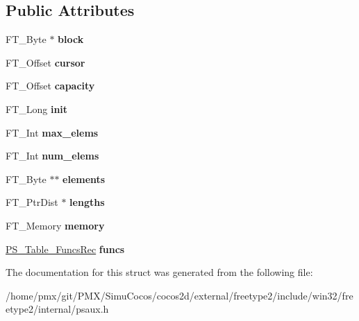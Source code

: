 \subsection*{Public Attributes}
\begin{DoxyCompactItemize}
\item 
\mbox{\label{structPS__TableRec___ae9a6fe75134258928e8cb8db52f8e4bc}} 
F\+T\+\_\+\+Byte $\ast$ {\bfseries block}
\item 
\mbox{\label{structPS__TableRec___a8725d30f75b6dc785b988ed689ac7e58}} 
F\+T\+\_\+\+Offset {\bfseries cursor}
\item 
\mbox{\label{structPS__TableRec___acf6d4f15ca247960cc7823b73d3c66bf}} 
F\+T\+\_\+\+Offset {\bfseries capacity}
\item 
\mbox{\label{structPS__TableRec___aa76fb2bcdcf4fc75e880b092bb9d3115}} 
F\+T\+\_\+\+Long {\bfseries init}
\item 
\mbox{\label{structPS__TableRec___a8594ec199ad792ed7ffd558806a7d23b}} 
F\+T\+\_\+\+Int {\bfseries max\+\_\+elems}
\item 
\mbox{\label{structPS__TableRec___a26706016251497b19039f2c002c4e9d5}} 
F\+T\+\_\+\+Int {\bfseries num\+\_\+elems}
\item 
\mbox{\label{structPS__TableRec___abb163930e42ca98e9c245a70ad6b6469}} 
F\+T\+\_\+\+Byte $\ast$$\ast$ {\bfseries elements}
\item 
\mbox{\label{structPS__TableRec___a6c5769b8a35094d64d43593247d9b8dc}} 
F\+T\+\_\+\+Ptr\+Dist $\ast$ {\bfseries lengths}
\item 
\mbox{\label{structPS__TableRec___a061872add9c6d1af67cfdfac5ce2b80d}} 
F\+T\+\_\+\+Memory {\bfseries memory}
\item 
\mbox{\label{structPS__TableRec___adced5ad36107c90012e9fafa55eab5b9}} 
\hyperlink{structPS__Table__FuncsRec__}{P\+S\+\_\+\+Table\+\_\+\+Funcs\+Rec} {\bfseries funcs}
\end{DoxyCompactItemize}


The documentation for this struct was generated from the following file\+:\begin{DoxyCompactItemize}
\item 
/home/pmx/git/\+P\+M\+X/\+Simu\+Cocos/cocos2d/external/freetype2/include/win32/freetype2/internal/psaux.\+h\end{DoxyCompactItemize}

